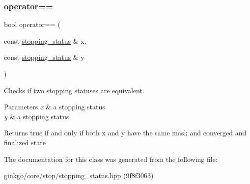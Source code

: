 \subsubsection{\texorpdfstring{operator==}{operator==}}
{\footnotesize\ttfamily bool operator== (\begin{DoxyParamCaption}\item[{const \hyperlink{classgko_1_1stopping__status}{stopping\+\_\+status} \&}]{x,  }\item[{const \hyperlink{classgko_1_1stopping__status}{stopping\+\_\+status} \&}]{y }\end{DoxyParamCaption})\hspace{0.3cm}{\ttfamily [friend]}}



Checks if two stopping statuses are equivalent. 


\begin{DoxyParams}{Parameters}
{\em x} & a stopping status \\
\hline
{\em y} & a stopping status\\
\hline
\end{DoxyParams}
\begin{DoxyReturn}{Returns}
true if and only if both {\ttfamily x} and {\ttfamily y} have the same mask and converged and finalized state 
\end{DoxyReturn}


The documentation for this class was generated from the following file\+:\begin{DoxyCompactItemize}
\item 
ginkgo/core/stop/stopping\+\_\+status.\+hpp (9f8f3063)\end{DoxyCompactItemize}
